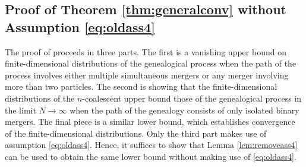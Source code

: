 \documentclass{article} %
\theoremstyle{definition}
\newcommand{\1}[1]{\mathbbm{1}_{\{#1\}}}
\begin{document}
\subsection{Proof of Theorem \ref{thm:generalconv} without Assumption \eqref{eq:oldass4}}\label{sec:proof}

The proof of \cite[Theorem 1]{koskela2018} proceeds in three parts.
The first is a vanishing upper bound on finite-dimensional distributions of the genealogical process when the path of the process involves either multiple simultaneous mergers or any merger involving more than two particles.
The second is showing that the finite-dimensional distributions of the $n$-coalescent upper bound those of the genealogical process in the limit $N \rightarrow \infty$ when the path of the genealogy consists of only isolated binary mergers.
The final piece is a similar lower bound, which establishes convergence of the finite-dimensional distributions.
Only the third part makes use of assumption \eqref{eq:oldass4}.
Hence, it suffices to show that Lemma \ref{lem:removeass4} can be used to obtain the same lower bound without making use of \eqref{eq:oldass4}.
\end{document}
